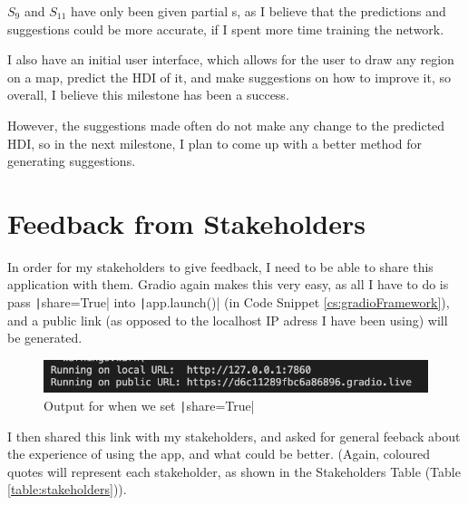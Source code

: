 \documentclass[12pt]{report}
\newcommand{\pil}[1]{\protect\texttt|#1|}
\begin{document}
$S_{9}$ and $S_{11}$ have only been given partial \checkmark{}s, as I believe that the predictions and suggestions could be more accurate, if I spent more time training the network.

I also have an initial user interface, which allows for the user to draw any region on a map, predict the HDI of it, and make suggestions on how to improve it, so overall, I believe this milestone has been a success.

However, the suggestions made often do not make any change to the predicted HDI, so in the next milestone, I plan to come up with a better method for generating suggestions.

\section{Feedback from Stakeholders}
In order for my stakeholders to give feedback, I need to be able to share this application with them. Gradio again makes this very easy, as all I have to do is pass \pil{share=True} into \pil{app.launch()} (in Code Snippet \ref{cs:gradioFramework}), and a public link (as opposed to the localhost IP adress I have been using) will be generated.

\begin{figure}[H]
\centering
\includegraphics[width=14cm]{shareTrue.png}
\caption{Output for when we set \pil{share=True}}\label{fig:shareTrue}
\end{figure}

I then shared this link with my stakeholders, and asked for general feeback about the experience of using the app, and what could be better. (Again, coloured quotes will represent each stakeholder, as shown in the Stakeholders Table (Table \ref{table:stakeholders})).
\end{document}
